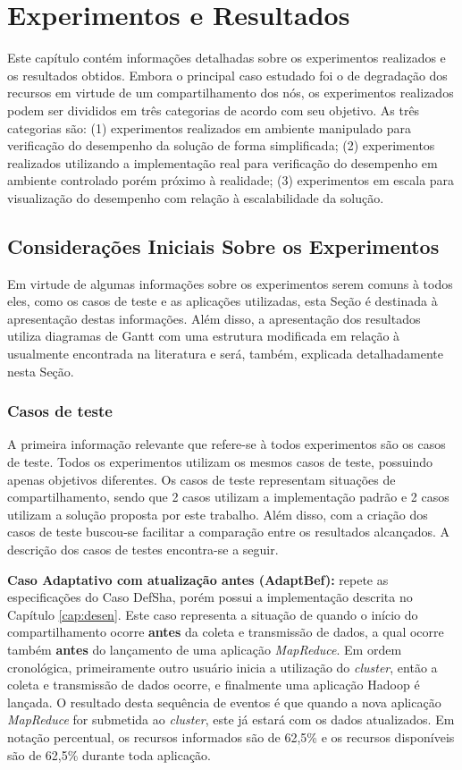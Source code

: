 \chapter{Experimentos e Resultados}
\label{chap:ExpRes}
Este capítulo contém informações detalhadas sobre os experimentos realizados e os resultados obtidos. Embora o principal caso estudado foi o de degradação dos recursos em virtude de um compartilhamento dos nós, os experimentos realizados podem ser divididos em três categorias de acordo com seu objetivo. As três categorias são: (1) experimentos realizados em ambiente manipulado para verificação do desempenho da solução de forma simplificada; (2) experimentos realizados utilizando a implementação real para verificação do desempenho em ambiente controlado porém próximo à realidade; (3) experimentos em escala para visualização do desempenho com relação à escalabilidade da solução.

\section{Considerações Iniciais Sobre os Experimentos}
Em virtude de algumas informações sobre os experimentos serem comuns à todos eles, como os casos de teste e as aplicações utilizadas, esta Seção é destinada à apresentação destas informações. Além disso, a apresentação dos resultados utiliza diagramas de Gantt com uma estrutura modificada em relação à usualmente encontrada na literatura e será, também, explicada detalhadamente nesta Seção.

\subsection{Casos de teste}
\label{sec:casosteste}
A primeira informação relevante que refere-se à todos experimentos são os casos de teste. Todos os experimentos utilizam os mesmos casos de teste, possuindo apenas objetivos diferentes. Os casos de teste representam situações de compartilhamento, sendo que 2 casos utilizam a implementação padrão e 2 casos utilizam a solução proposta por este trabalho. Além disso, com a criação dos casos de teste buscou-se facilitar a comparação entre os resultados alcançados. A descrição dos casos de testes encontra-se a seguir.

\textbf{Caso Adaptativo com atualização antes (AdaptBef):} repete as especificações do Caso DefSha, porém possui a implementação descrita no Capítulo \ref{cap:desen}. Este caso representa a situação de quando o início do compartilhamento ocorre \textbf{antes} da coleta e transmissão de dados, a qual ocorre também \textbf{antes} do lançamento de uma aplicação \textit{MapReduce}. Em ordem cronológica, primeiramente outro usuário inicia a utilização do \textit{cluster}, então a coleta e transmissão de dados ocorre, e finalmente uma aplicação Hadoop é lançada. O resultado desta sequência de eventos é que quando a nova aplicação \textit{MapReduce} for submetida ao \textit{cluster}, este já estará com os dados atualizados. Em notação percentual, os recursos informados são de 62,5\% e os recursos disponíveis são de 62,5\% durante toda aplicação.

